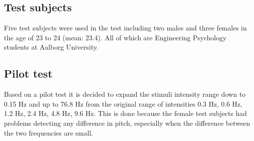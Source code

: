 \subsection*{Test subjects}
%
Five test subjects were used in the test including two males and three females in the age of 23 to 24 (mean: 23.4). All of which are Engineering Psychology students at Aalborg University.

\subsection*{Pilot test}
%
Based on a pilot test it is decided to expand the stimuli intensity range down to 0.15 Hz and up to 76.8 Hz from the original range of intensities 0.3 Hz, 0.6 Hz, 1.2 Hz, 2.4 Hz, 4.8 Hz, 9.6 Hz. This is done because the female test subjects had problems detecting any difference in pitch, especially when the difference between the two frequencies are small.

